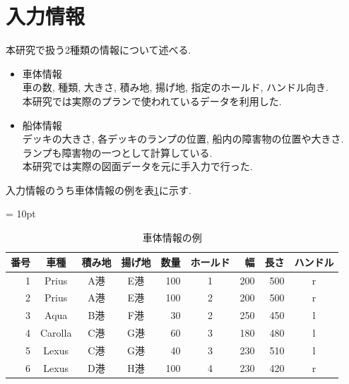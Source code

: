 \section{入力情報}
本研究で扱う2種類の情報について述べる.

\begin{itemize}
    \item 車体情報 \\
    車の数, 種類, 大きさ, 積み地, 揚げ地, 指定のホールド, ハンドル向き. \\
    本研究では実際のプランで使われているデータを利用した.
    \item 船体情報 \\
    デッキの大きさ, 各デッキのランプの位置, 船内の障害物の位置や大きさ. \\
    ランプも障害物の一つとして計算している. \\
    本研究では実際の図面データを元に手入力で行った. \\ 

\end{itemize}
入力情報のうち車体情報の例を表\ref{table21}に示す.

\begin{table}[htbp]
    \tabcolsep = 10pt
    \renewcommand{\arraystretch}{0.7}
    \caption{車体情報の例}
    \label{table21}
    \begin{center}
    \begin{tabular}{rcccrcrrc} 
        \hline
    番号 & 車種 & 積み地 & 揚げ地 & 数量 & ホールド & 幅 & 長さ & ハンドル\\ 
    \hline
    1 & Prius & A港 & E港 & 100 & 1 & 200 & 500 & r \\
    2 & Prius & A港 & E港 & 100 & 2 & 200 & 500 & r \\
    3 & Aqua & B港 & F港 & 30 & 2 & 250 & 450 & l \\
    4 & Carolla & C港 & G港 & 60 & 3 & 180 & 480 & l \\
    5 & Lexus & C港 & G港 & 40 & 3 & 230 & 510 & l \\
    6 & Lexus & D港 & H港 & 100 & 4 & 230 & 420 & r \\
    \hline
    \end{tabular}
    \end{center}
    \end{table}




